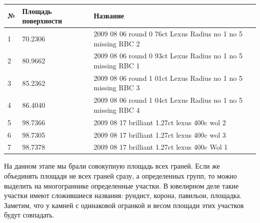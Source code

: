 \documentclass[a4paper,12pt, titlepage]{article}
\begin{document}

\begin{center}
\begin{tabular}{|p{0.5cm}|p{2.4cm}|p{12cm}|}
\hline
№ & Площадь поверхности & Название\\
\hline
1 & 70.2306 & 2009 08 06 round 0 76ct Lexus Radius no 1 no 5 missing RBC 2\\
\hline
2 & 80.9662 & 2009 08 06 round 0 93ct Lexus Radius no 1 no 5 missing RBC 1\\
\hline
3 & 85.2362 & 2009 08 06 round 1 01ct Lexus Radius no 1 no 5 missing RBC 3\\
\hline
4 & 86.4040 & 2009 08 06 round 1 04ct Lexus Radius no 1 no 5 missing RBC 4\\
\hline
5 & 98.7366 & 2009 08 17 brilliant 1.27ct lexus 400c wol 2\\
\hline
6 & 98.7305 & 2009 08 17 brilliant 1.27ct lexus 400c wol 3\\
\hline
7 & 98.7378 & 2009 08 17 brilliant 1.27ct lexus 400c Wol 1\\
\hline  
\end{tabular}
\end{center}


На данном этапе мы брали совокупную площадь всех граней. Если же объединять площади не всех граней сразу, 
а определенных групп, то можно выделить на многограннике определенные участки. В ювелирном деле такие участки имеют 
сложившиеся названия: рундист, корона, павильон, площадка. Заметим, что у камней с одинаковой огранкой и весом
площади этих участков будут совпадать.
\end{document}
